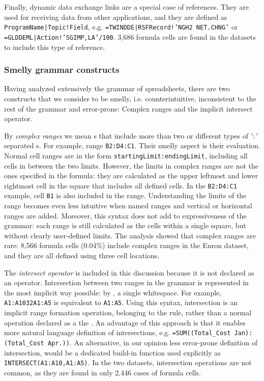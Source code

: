 \documentclass[conference]{IEEEtran}
\begin{document}
Finally, dynamic data exchange links are a special case of references. They are used for receiving data from other applications, and they are defined as \texttt{ProgramName|Topic!Field}, e.g. \texttt{=TWINDDE|RSFRecord!'NGH2 NET.CHNG'} or \texttt{=GLDDEML|Action!'SGIMP,LA'/100}. 3,686 formula cells are found in the datasets to include this type of reference.
 
\subsubsection{Smelly grammar constructs}
Having analyzed extensively the grammar of spreadsheets, there are two constructs that we consider to be smelly, i.e. counterintuitive, inconsistent to the rest of the grammar and error-prone: Complex ranges and the implicit intersect operator.

By \textit{complex ranges} we mean s that include more than two or different types of $':'$ separated s. For example, range \texttt{B2:D4:C1}. Their smelly aspect is their evaluation. Normal cell ranges are in the form \texttt{startingLimit:endingLimit}, including all cells in between the two limits. However, the limits in complex ranges are not the ones specified in the formula: they are calculated as the upper leftmost and lower rightmost cell in the square that includes all defined cells. In the \texttt{B2:D4:C1} example, cell \texttt{B1} is also included in the range. Understanding the limits of the range becomes even less intuitive when named ranges and vertical or horizontal ranges are added. Moreover, this syntax does not add to expressiveness of the grammar: each range is still calculated as the cells within a single square, but without clearly user-defined limits. The analysis showed that complex ranges are rare: 8,566 formula cells	(0.04\%) include complex ranges in the Enron dataset, and they are all defined using three cell locations. 

The \textit{intersect operator} is included in this discussion because it is not declared as an operator. Intersection between two ranges in the grammar is represented in the most implicit way possible: by \texttt{}, a single whitespace. For example, \texttt{A1:A10\char32A1:A5} is equivalent to \texttt{A1:A5}. Using this syntax, intersection is an implicit range formation operation, belonging to the  rule, rather than a normal operation declared as a the . An advantage of this approach is that it enables more natural language definition of intersections, e.g.  \texttt{=SUM((Total_Cost Jan):(Total_Cost Apr.))}. An alternative, in our opinion less error-prone definition of intersection, would be a dedicated build-in function used explicitly as \texttt{INTERSECT(A1:A10,A1:A5)}. In the two datasets, intersection operations are not common, as they are found in only 2,446 cases of formula cells.
\end{document}
